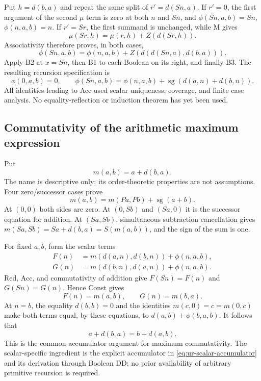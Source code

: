 \documentclass[11pt]{article}
\theoremstyle{definition}\newtheorem{definition}[theorem]{Definition}
\begin{document}
Put $h=d(b,a)$ and repeat the same split of $r'=d(Sn,a)$.
If $r'=0$, the first argument of the second $\mu$ term is zero at both
$n$ and $Sn$, and $\phi(Sn,a,b)=Sn$, $\phi(n,a,b)=n$.
If $r'=Sr$, the first summand is unchanged, while M gives
\[
                 \mu(Sr,h)=\mu(r,h)+Z(d(Sr,h)).
\]
Associativity therefore proves, in both cases,
\[
 \phi(Sn,a,b)=\phi(n,a,b)+Z(d(d(Sn,a),d(b,a))).
\]
Apply B2 at $x=Sn$, then B1 to each Boolean on its right, and finally B3.
The resulting recursion specification is
\[
 \boxed{\quad
 \phi(0,a,b)=0,\qquad
 \phi(Sn,a,b)=\phi(n,a,b)+\operatorname{sg}(d(a,n)+d(b,n)).
 \quad}                                                   \tag{Acc}
\]
All identities leading to Acc used scalar uniqueness, coverage, and
finite case analysis. No equality-reflection or induction theorem has
yet been used.

\subsection{Commutativity of the arithmetic maximum expression}

Put
\[
                              m(a,b)=a+d(b,a).
\]
The name is descriptive only; its order-theoretic properties are not
assumptions. Four zero/successor cases prove
\[
                  m(a,b)=m(Pa,Pb)+\operatorname{sg}(a+b).
 \tag{Red}\label{eq:ur-max-diagonal-reduction}
\]
At $(0,0)$ both sides are zero. At $(0,Sb)$ and $(Sa,0)$ it is the
successor equation for addition. At $(Sa,Sb)$, simultaneous subtraction
cancellation gives
$m(Sa,Sb)=Sa+d(b,a)=S(m(a,b))$, and the sign of the sum is one.

For fixed $a,b$, form the scalar terms
\begin{align*}
 F(n)&=m(d(a,n),d(b,n))+\phi(n,a,b),\\
 G(n)&=m(d(b,n),d(a,n))+\phi(n,a,b).
\end{align*}
Red, Acc, and commutativity of addition give $F(Sn)=F(n)$ and
$G(Sn)=G(n)$. Hence Const gives
\[
                          F(n)=m(a,b),\qquad G(n)=m(b,a).
\]
At $n=b$, the equality $d(b,b)=0$ and the identities
$m(c,0)=c=m(0,c)$ make both terms equal, by these equations, to
$d(a,b)+\phi(b,a,b)$. It follows that
\[
                    \boxed{\ a+d(b,a)=b+d(a,b).\ }       \tag{Max}
\]
This is the common-accumulator argument for maximum commutativity.
The scalar-specific ingredient is the explicit accumulator in
\eqref{eq:ur-scalar-accumulator} and its derivation through Boolean DD;
no prior availability of arbitrary primitive recursion is required.
\end{document}
